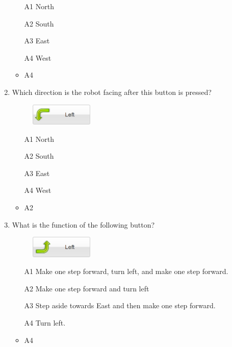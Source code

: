 \documentclass[article,A4,12pt]{llncs}
\begin{document}
\begin{enumerate}
\begin{enumerate}
\item[A1] North
\item[A2] South
\item[A3] East
\item[A4] West
\end{enumerate}
  \begin{itemize}
    \item A4
  \end{itemize}
\item Which direction is the robot facing after 
this button is pressed?
\begin{figure}[!ht]
\begin{center}
\includegraphics[width=3cm]{imgk/button-left-3.png}
\end{center}
\end{figure}
\begin{enumerate}
\item[A1] North
\item[A2] South
\item[A3] East
\item[A4] West
\end{enumerate}
  \begin{itemize}
    \item A2
  \end{itemize}
\newpage
\item What is the function of the following button?
\begin{figure}[!ht]
\begin{center}
\includegraphics[width=3cm]{imgk/button-left-1.png}
\end{center}
\end{figure}
\begin{enumerate}
\item[A1] Make one step forward, turn left, and make one step forward.
\item[A2] Make one step forward and turn left
\item[A3] Step aside towards East and then make one step forward.
\item[A4] Turn left.
\end{enumerate}
  \begin{itemize}
    \item A4

\end{itemize}
\end{enumerate}
\end{document}
